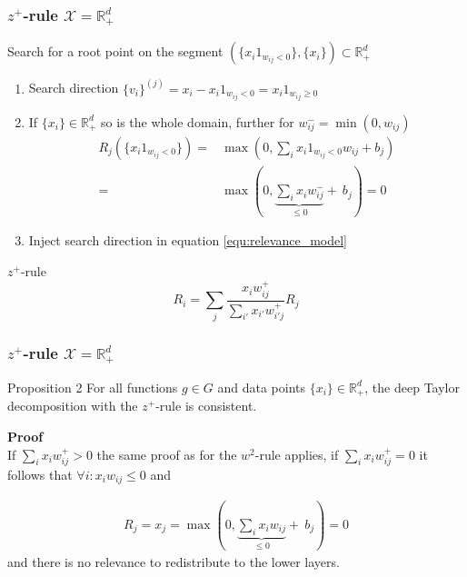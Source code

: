 \documentclass{beamer}
\begin{document}
\begin{frame}
\frametitle{$z^+$-rule $\mathcal{X}=\mathbb{R}_+^d$}
\vspace{0.5cm}
Search for a root point on the segment $(\{x_i 1_{w_{ij}<0}\},\{x_i\})\subset \mathbb{R}_+^d$\\
\begin{enumerate}
	\item Search direction $\{v_i\}^{(j)} = x_i - x_i 1_{w_{ij}<0} = x_i 1_{w_{ij}\geq0}$
	\item If $\{x_i\} \in \mathbb{R}_+^d$ so is the whole domain, further for $w_{ij}^-=\min(0,w_{ij})$
	\
	\begin{align*}
		R_j(\{x_i1_{w_{ij}<0}\}) =& \max(0, \sum_i x_i 1_{w_{ij}<0} w_{ij} + b_j)\\
		=& \max(0, \underbrace{\sum_i x_i  w_{ij}^-}_{\leq 0} +\ b_j) = 0
	\end{align*}
	\vspace{-0.25cm}
	\item Inject search direction in equation \eqref{equ:relevance_model}
\end{enumerate}

\pause
\begin{block}{$z^+$-rule}
\begin{equation*}
R_i =  \sum_j \frac{x_i w_{ij}^+}{\sum_{i'} x_{i'} w_{i'j}^+} R_j
\end{equation*}
\end{block}

\end{frame}



\begin{frame}
\frametitle{$z^+$-rule $\mathcal{X}=\mathbb{R}^d_+$}

\begin{block}{Proposition 2}
For all functions $g \in G$ and data points $\{x_i\} \in \mathbb{R}_+^d$, the deep Taylor decomposition with the $z^+$-rule is consistent.
\end{block}
\vspace{0.5cm}

\pause
\textbf{Proof}\\
If $\sum_i x_i w_{ij}^+ >0$ the same proof as for the $w^2$-rule applies, if $\sum_i x_i w_{ij}^+ =0$ it follows that $\forall i: x_i w_{ij} \leq0$ and 

\begin{align*}
 R_j = x_j = \max(0,\underbrace{\sum_i x_i w_{ij}}_{\leq 0} +\ b_j) = 0
\end{align*}
and there is no relevance to redistribute to the lower layers.


\end{frame}
\end{document}
